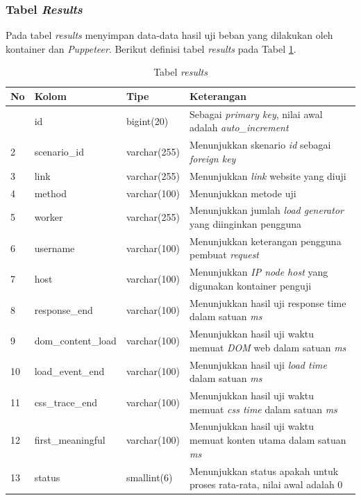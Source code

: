			\subsubsection{Tabel \textit{Results}}
				Pada tabel \textit{results} menyimpan data-data hasil uji beban yang dilakukan oleh kontainer dan \textit{Puppeteer}. Berikut definisi tabel \textit{results} pada Tabel \ref{tabelresults}.
				
				\begin{longtable}{|p{}|p{}|p{}|p{}|}
					\caption{Tabel \textit{results}} \label{tabelresults} \\
					\hline
					\textbf{No} & \textbf{Kolom} & \textbf{Tipe} & \textbf{Keterangan} \\ \hline
					\endhead
					\endfoot
					\endlastfoot
					1 & id & bigint(20) & Sebagai \textit{primary key}, nilai awal adalah \textit{auto\_increment} \\ \hline
					2 & scenario\_id & varchar(255) & Menunjukkan skenario \textit{id} sebagai \textit{foreign key} \\ \hline
					3 & link & varchar(255) & Menunjukkan \textit{link} website yang diuji \\ \hline
					4 & method & varchar(100) & Menunjukkan metode uji \\ \hline
					5 & worker & varchar(255) & Menunjukkan jumlah \textit{load generator} yang diinginkan pengguna \\ \hline
					6 & username & varchar(100) & Menunjukkan keterangan pengguna pembuat \textit{request} \\ \hline
					7 & host & varchar(100) & Menunjukkan \textit{IP node host} yang digunakan kontainer penguji \\ \hline
					8 & response\_end & varchar(100) & Menunjukkan hasil uji response time dalam satuan \textit{ms} \\ \hline
					9 & dom\_content\_load & varchar(100) & Menunjukkan hasil uji waktu memuat \textit{DOM} web dalam satuan \textit{ms} \\ \hline
					10 & load\_event\_end & varchar(100) & Menunjukkan hasil uji \textit{load time} dalam satuan \textit{ms} \\ \hline
					11 & css\_trace\_end & varchar(100) & Menunjukkan hasil uji waktu memuat \textit{css time} dalam satuan \textit{ms} \\ \hline
					12 & first\_meaningful & varchar(100) & Menunjukkan hasil uji waktu memuat konten utama dalam satuan \textit{ms} \\ \hline
					13 & status & smallint(6) & Menunjukkan status apakah untuk proses rata-rata, nilai awal adalah 0 \\ \hline
				\end{longtable}
		
